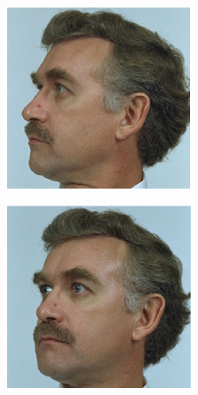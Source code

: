 \documentclass[xetex,aspectratio=169,xcolor,professionalfonts,hyperref]{beamer}
\begin{document}
\begin{frame}
{{\begin{figure}[hb]
\begin{subfigure}[b]{0.24\columnwidth}
                \includegraphics[width=\columnwidth]{figures/face2.png}
            \end{subfigure}
            \hfill
            \begin{subfigure}[b]{0.24\columnwidth}
                \centering
                \includegraphics[width=\columnwidth]{figures/face3.png}

\end{subfigure}
\end{figure}}}
\end{frame}
\end{document}
